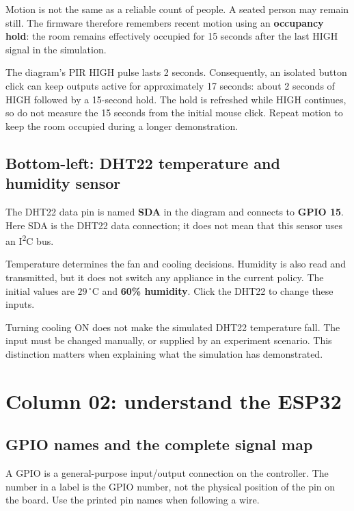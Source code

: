 \documentclass[11pt,a4paper]{article}
\newcommand{\temp}[1]{\ensuremath{#1\,^{\circ}\mathrm{C}}}
\begin{document}
Motion is not the same as a reliable count of people. A seated person
may remain still. The firmware therefore remembers recent motion using
an \textbf{occupancy hold}: the room remains effectively occupied for
15 seconds after the last HIGH signal in the simulation.

The diagram's PIR HIGH pulse lasts 2 seconds. Consequently, an isolated
button click can keep outputs active for approximately 17 seconds:
about 2 seconds of HIGH followed by a 15-second hold. The hold is
refreshed while HIGH continues, so do not measure the 15 seconds from
the initial mouse click. Repeat motion to keep the room occupied during
a longer demonstration.

\subsection{Bottom-left: DHT22 temperature and humidity sensor}
The DHT22 data pin is named \textbf{SDA} in the diagram and connects to
\textbf{GPIO 15}. Here SDA is the DHT22 data connection; it does not mean
that this sensor uses an I\textsuperscript{2}C bus.

Temperature determines the fan and cooling decisions. Humidity is also
read and transmitted, but it does not switch any appliance in the
current policy. The initial values are \textbf{\temp{29}} and
\textbf{60\% humidity}. Click the DHT22 to change these inputs.

Turning cooling ON does not make the simulated DHT22 temperature fall.
The input must be changed manually, or supplied by an experiment
scenario. This distinction matters when explaining what the simulation
has demonstrated.

\section{Column 02: understand the ESP32}
\subsection{GPIO names and the complete signal map}
A GPIO is a general-purpose input/output connection on the controller.
The number in a label is the GPIO number, not the physical position of
the pin on the board. Use the printed pin names when following a wire.
\end{document}
